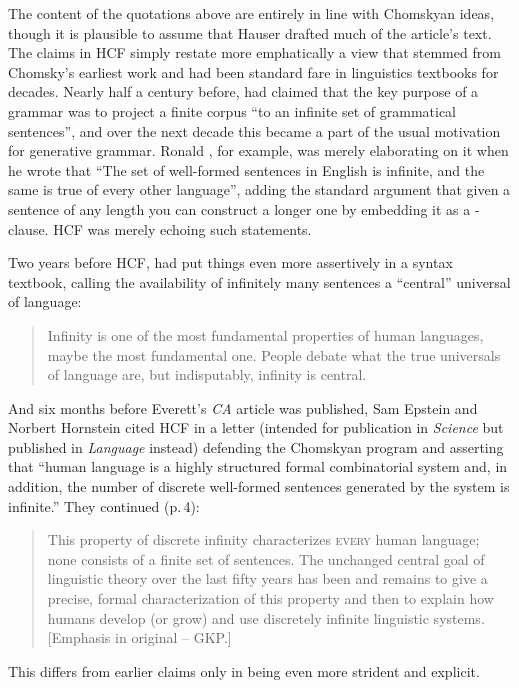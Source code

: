 \documentclass[output=paper,colorlinks,citecolor=brown
]{langscibook}
\begin{document}
The content of the quotations above are entirely in line with Chomskyan
ideas, though it is plausible to assume that Hauser drafted much of the
article's text. The claims in HCF simply restate more emphatically a
view that stemmed from Chomsky's earliest work and had been standard
fare in linguistics textbooks for decades. Nearly half a century before,
\citet[113]{Chomsky56} had claimed that the key purpose
of a grammar was to project a finite corpus ``to an infinite set of
grammatical sentences'', and over the next decade this became a part
of the usual motivation for generative grammar. Ronald \citet[31]{Langacker68}, for example, was merely elaborating on
it when he wrote that ``The set of well-formed sentences in English
is infinite, and the same is true of every other language'', adding
the standard argument that given a sentence of any length you can
construct a longer one by embedding it as a -clause.
HCF was merely echoing such statements.

Two years before HCF, \citet[3]{Lasnik00} had put things
even more assertively in a syntax textbook, calling the availability
of infinitely many sentences a ``central'' universal of language:
\begin{quote}
Infinity is one of the most fundamental properties of human languages,
maybe the most fundamental one. People debate what the true universals
of language are, but indisputably, infinity is central.
\end{quote}
And six months before Everett's \textit{CA} article was published,
Sam Epstein and Norbert Hornstein \citeyearpar{EpstHorn05} cited HCF in
a letter (intended for publication in \textit{Science} but published
in \textit{Language} instead) defending the Chomskyan program and asserting
that ``human language is a highly structured formal combinatorial system
and, in addition, the number of discrete well-formed sentences generated
by the system is infinite.'' They continued (p.\,4):
\begin{quote}
This property of discrete infinity characterizes \mbox{\textsc{every}}
human language; none consists of a finite set of sentences. The unchanged
central goal of linguistic theory over the last fifty years has been and
remains to give a precise, formal characterization of this property and
then to explain how humans develop (or grow) and use discretely infinite
linguistic systems. [Emphasis in original -- GKP.]
\end{quote}
This differs from earlier claims only in being even more strident and
explicit.
\end{document}
